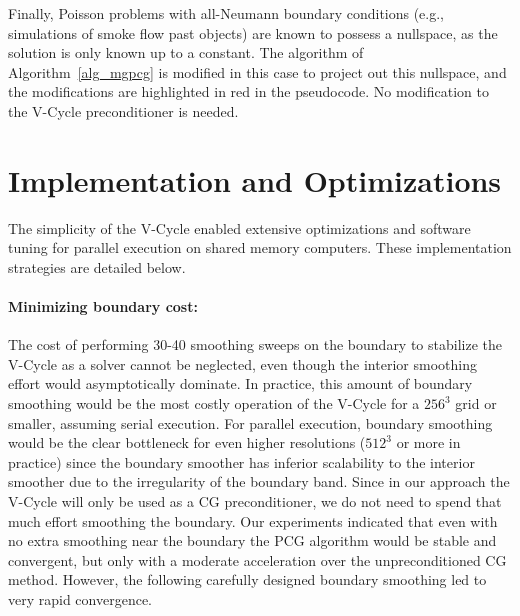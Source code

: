Finally, Poisson problems with all-Neumann boundary conditions (e.g., simulations of smoke flow past objects) are known to possess a nullspace, as the solution is only known up to a
constant. The algorithm of Algorithm~\ref{alg_mgpcg} is modified in this case to project out this nullspace, and the modifications are highlighted in red in the pseudocode. No modification
to the V-Cycle preconditioner is needed.

\section{Implementation and Optimizations}
\label{sec_implementation}

The simplicity of the V-Cycle enabled extensive optimizations and software tuning for parallel execution on shared memory
computers. These implementation strategies are detailed below.

\paragraph{Minimizing boundary cost:} The cost of performing 30-40 smoothing sweeps on the boundary to stabilize the V-Cycle as a solver cannot be neglected, even though the interior
smoothing effort would asymptotically dominate. In practice, this amount of boundary smoothing would be the most costly operation of the V-Cycle for a $256^3$ grid or smaller, assuming serial
execution. For parallel execution, boundary smoothing would be the clear bottleneck for even higher resolutions ($512^3$ or more in practice) since the boundary smoother has inferior
scalability to the interior smoother due to the irregularity of the boundary band. Since in our approach the V-Cycle will only be used as a CG preconditioner, we do not need to spend
that much effort smoothing the boundary. Our experiments indicated that even with no extra smoothing near the boundary the PCG algorithm would be stable and convergent, but only with a
moderate acceleration over the unpreconditioned CG method. However, the following carefully designed boundary smoothing led to very rapid convergence.

